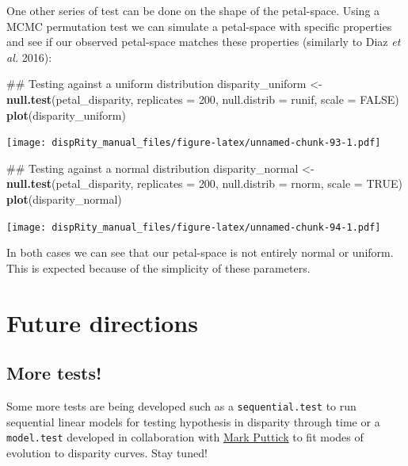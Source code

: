 \documentclass[]{book}
\newenvironment{Shaded}{\begin{snugshade}}{\end{snugshade}}
\newcommand{\KeywordTok}[1]{\textcolor[rgb]{0.13,0.29,0.53}{\textbf{#1}}}
\newcommand{\DataTypeTok}[1]{\textcolor[rgb]{0.13,0.29,0.53}{#1}}
\newcommand{\DecValTok}[1]{\textcolor[rgb]{0.00,0.00,0.81}{#1}}
\newcommand{\StringTok}[1]{\textcolor[rgb]{0.31,0.60,0.02}{#1}}
\newcommand{\OtherTok}[1]{\textcolor[rgb]{0.56,0.35,0.01}{#1}}
\newcommand{\NormalTok}[1]{#1}
\theoremstyle{definition}
\theoremstyle{definition}
\theoremstyle{remark}
\begin{document}
One other series of test can be done on the shape of the petal-space.
Using a MCMC permutation test we can simulate a petal-space with
specific properties and see if our observed petal-space matches these
properties (similarly to Diaz \emph{et al.} 2016):

\begin{Shaded}
\begin{Highlighting}[]
\NormalTok{## Testing against a uniform distribution}
\NormalTok{disparity_uniform <-}\StringTok{ }\KeywordTok{null.test}\NormalTok{(petal_disparity, }\DataTypeTok{replicates =} \DecValTok{200}\NormalTok{,}
    \DataTypeTok{null.distrib =}\NormalTok{ runif, }\DataTypeTok{scale =} \OtherTok{FALSE}\NormalTok{)}
\KeywordTok{plot}\NormalTok{(disparity_uniform)}
\end{Highlighting}
\end{Shaded}

\texttt{[image: dispRity\_manual\_files/figure-latex/unnamed-chunk-93-1.pdf]}

\begin{Shaded}
\begin{Highlighting}[]
\NormalTok{## Testing against a normal distribution}
\NormalTok{disparity_normal <-}\StringTok{ }\KeywordTok{null.test}\NormalTok{(petal_disparity, }\DataTypeTok{replicates =} \DecValTok{200}\NormalTok{,}
    \DataTypeTok{null.distrib =}\NormalTok{ rnorm, }\DataTypeTok{scale =} \OtherTok{TRUE}\NormalTok{)}
\KeywordTok{plot}\NormalTok{(disparity_normal)}
\end{Highlighting}
\end{Shaded}

\texttt{[image: dispRity\_manual\_files/figure-latex/unnamed-chunk-94-1.pdf]}

In both cases we can see that our petal-space is not entirely normal or
uniform. This is expected because of the simplicity of these parameters.

\chapter{Future directions}\label{future-directions}

\section{More tests!}\label{more-tests}

Some more tests are being developed such as a \texttt{sequential.test}
to run sequential linear models for testing hypothesis in disparity
through time or a \texttt{model.test} developed in collaboration with
\href{https://puttickbiology.wordpress.com/}{Mark Puttick} to fit modes
of evolution to disparity curves. Stay tuned!
\end{document}
